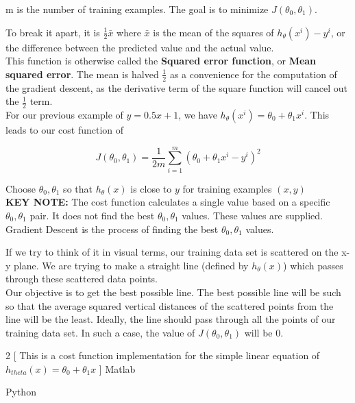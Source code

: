 m is the number of training examples. The goal is to minimize $J(\theta_{0}, \theta_{1})$.

To break it apart, it is $\frac{1}{2} \bar{x}$ where $\bar{x}$ is the mean of the squares of $h_{\theta}(x^{i}) -y^{i}$, or the difference between the predicted value and the actual value.\\

This function is otherwise called the \textbf{Squared error function}, or \textbf{Mean squared error}. The mean is halved $\frac{1}{2}$ as a convenience for the computation of the gradient descent, as the derivative term of the square function will cancel out the $\frac{1}{2}$ term. \\

For our previous example of $y=0.5x + 1$, we have $h_{\theta}(x^{i}) = \theta_{0} + \theta_{1}x^{i}$.  This leads to our cost function of 

\begin{equation}
J(\theta_{0}, \theta_{1}) = \frac{1}{2m} \sum_{i=1}^{m} (\theta_{0} + \theta_{1}x^{i} - y^{i})^{2} 
\end{equation}

Choose $\theta_{0}, \theta_{1}$ so that $h_{\theta}(x)$ is close to $y$ for training examples $(x,y)$\\

\textbf{KEY NOTE:} The cost function calculates a single value based on a specific $\theta_{0}, \theta_{1}$ pair.  It does not find the best $\theta_{0}, \theta_{1}$ values.  These values are supplied.  Gradient Descent is the process of finding the best $\theta_{0}, \theta_{1}$ values.

If we try to think of it in visual terms, our training data set is scattered on the x-y plane. We are trying to make a straight line (defined by $h_{\theta}(x)$) which passes through these scattered data points.\\

Our objective is to get the best possible line. The best possible line will be such so that the average squared vertical distances of the scattered points from the line will be the least. Ideally, the line should pass through all the points of our training data set. In such a case, the value of $J(\theta_0, \theta_1)$ will be 0. 

\newpage
\begin{multicols}{2}
  [
    This is a cost function implementation for the simple linear equation of $h_{theta}(x) = \theta_{0} + \theta_{1}x$
  ]
  Matlab\\
  \columnbreak

  Python\\
  
\end{multicols}

